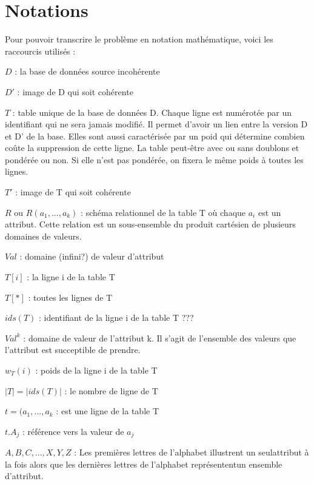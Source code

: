 \documentclass[12pt, a4paper, oneside, titlepage]{book}%
\begin{document}
\clearpage

\section{Notations}\label{SECnotations}
Pour pouvoir transcrire le problème en notation mathématique, voici les raccourcis utilisés : 
\begin{description}
\item{$D$ : } la base de données source incohérente %
\item{$D'$ : } image de D qui soit cohérente
\item{$T$ : } table unique de la base de données D. Chaque ligne est numérotée par un identifiant qui ne sera jamais modifié. Il permet d'avoir un lien entre la version D et D' de la base. Elles sont aussi caractérisée par un poid qui détermine combien coûte la suppression de cette ligne. La table peut-être avec ou sans doublons et pondérée ou non. Si elle n'est pas pondérée, on fixera le même poids à toutes les lignes.
\item{$T'$ : } image de T qui soit cohérente
\item{$R$ ou $R(a_{1}, ... , a_{k})$ : } schéma relationnel de la table T où chaque $a_i$ est un attribut. Cette relation est un sous-ensemble du produit cartésien de plusieurs domaines de valeurs.
\item{$Val$ : } domaine (infini?) de valeur d'attribut
\item{$T[i]$ : } la ligne i de la table T
\item{$T[*]$ : } toutes les lignes de T
\item{$ids(T)$ : } identifiant de la ligne i de la table T ???
\item{$Val^k$ : } domaine de valeur de l'attribut k. Il s'agit de l'ensemble des valeurs que l'attribut est succeptible de prendre.
\item{$w_T(i)$ : } poids de la ligne i de la table T
\item{$|T| = |ids(T)|$ : } le nombre de ligne de T
\item{$t = (a_1, ..., a_k$ : } est une ligne de la table T
\item{$t.A_j$ : } référence vers la valeur de $a_j$
\item{$A, B,C,..., X, Y, Z$ : } Les premières lettres de l'alphabet illustrent un seulattribut à la fois alors que les dernières lettres de l'alphabet représententun ensemble d'attribut.

\end{description}
\end{document}
